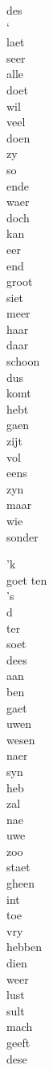 \begin{minipage}[t]{0.25\textwidth}
	des\\
	‘\\
	laet\\
	seer\\
	alle\\
	doet\\
	wil\\
	veel\\
	doen\\
	zy\\
	so\\
	ende\\
	waer\\
	doch\\
	kan\\
	eer\\
	end\\
	groot\\
	siet\\
	meer\\
	haar\\
	daar\\
	schoon\\
	dus\\
	komt\\
	hebt\\
	gaen\\
	zijt\\
	vol\\
	eens\\
	zyn\\
	maar\\
	wie\\
	sonder
\end{minipage}
\begin{minipage}[t]{0.25\textwidth}
	'k\\
	goet
	ten\\
	's\\
	d\\
	ter\\
	soet\\
	dees\\
	aan\\
	ben\\
	gaet\\
	uwen\\
	wesen\\
	naer\\
	syn\\
	heb\\
	zal\\
	nae\\
	uwe\\
	zoo\\
	staet\\
	gheen\\
	int\\
	toe\\
	vry\\
	hebben\\
	dien\\
	weer\\
	lust\\
	sult\\
	mach\\
	geeft\\
	dese\\
\end{minipage}